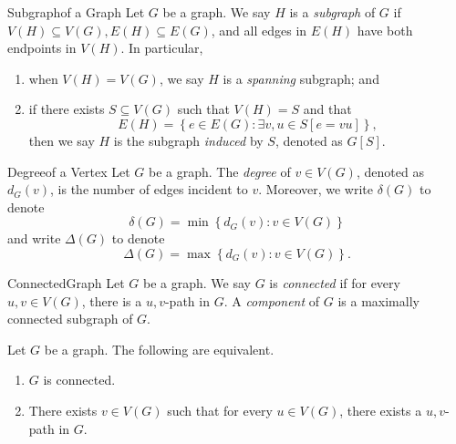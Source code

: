 \documentclass[co342]{subfiles}
\begin{document}
    \begin{definition}{Subgraph}{of a Graph}
        Let $G$ be a graph. We say $H$ is a \emph{subgraph} of $G$ if $V\left( H \right) \subseteq V\left( G \right), E\left( H \right) \subseteq E\left( G \right)$, and all edges in $E\left( H \right)$ have both endpoints in $V\left( H \right)$. In particular, 
        \begin{enumerate}
            \item when $V\left( H \right) = V\left( G \right)$, we say $H$ is a \emph{spanning} subgraph; and
            \item if there exists $S\subseteq V\left( G \right)$ such that $V\left( H \right) = S$ and that
                \begin{equation*}
                    E\left( H \right) = \left\lbrace e\in E\left( G \right) : \exists v,u\in S\left[ e=vu \right]  \right\rbrace ,
                \end{equation*}
                then we say $H$ is the subgraph \emph{induced} by $S$, denoted as $G\left[ S \right]$.
        \end{enumerate}
    \end{definition}

    \begin{definition}{Degree}{of a Vertex}
        Let $G$ be a graph. The \emph{degree} of $v\in V\left( G \right)$, denoted as $d_G\left( v \right)$, is the number of edges incident to $v$. Moreover, we write $\delta\left( G \right)$ to denote
        \begin{equation*}
            \delta\left( G \right) = \min\left\lbrace d_G\left( v \right) : v\in V\left( G \right)  \right\rbrace 
        \end{equation*}
        and write $\Delta\left( G \right)$ to denote
        \begin{equation*}
            \Delta\left( G \right) = \max\left\lbrace d_G\left( v \right) : v\in V\left( G \right)  \right\rbrace .
        \end{equation*}
    \end{definition}

    \begin{definition}{Connected}{Graph}
        Let $G$ be a graph. We say $G$ is \emph{connected} if for every $u,v\in V\left( G \right)$, there is a $u,v$-path in $G$. A \emph{component} of $G$ is a maximally connected subgraph of $G$.
    \end{definition}

    \clearpage
    \begin{prop}{}
        Let $G$ be a graph. The following are equivalent.
        \begin{enumerate}
            \item $G$ is connected.
            \item There exists $v\in V\left( G \right)$ such that for every $u\in V\left( G \right)$, there exists a $u,v$-path in $G$.
        \end{enumerate}
    \end{prop}
\end{document}
